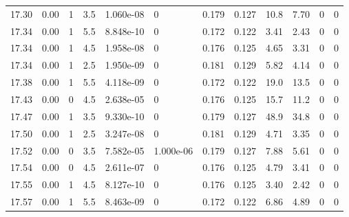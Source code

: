 \documentclass[preview]{standalone}
\begin{document}
{{{{{{{{{{{{{{{{\begin{tabular}{L{1.2cm}C{1.2cm} C{0.3cm}C{0.5cm} C{1.4cm}C{1.4cm} C{1.4cm}C{1.4cm} C{1.6cm}C{1.6cm} C{1.6cm}C{1.6cm}}
  17.30  &  0.00  & 1     & 3.5 &  1.060e-08  & 0  &  0.179&   0.127& 10.8 & 7.70   &  0 & 0  \\ 
  17.34  &  0.00  & 1     & 5.5 &  8.848e-10  & 0  &  0.172&   0.122& 3.41 & 2.43   &  0 & 0  \\ 
  17.34  &  0.00  & 1     & 4.5 &  1.958e-08  & 0  &  0.176&   0.125& 4.65 & 3.31   &  0 & 0  \\ 
  17.34  &  0.00  & 1     & 2.5 &  1.950e-09  & 0  &  0.181&   0.129& 5.82 & 4.14   &  0 & 0  \\ 
  17.38  &  0.00  & 1     & 5.5 &  4.118e-09  & 0  &  0.172&   0.122& 19.0 & 13.5   &  0 & 0  \\ 
  17.43  &  0.00  & 0     & 4.5 &  2.638e-05  & 0  &  0.176&   0.125& 15.7 & 11.2   &  0 & 0  \\ 
  17.47  &  0.00  & 1     & 3.5 &  9.330e-10  & 0  &  0.179&   0.127& 48.9 & 34.8   &  0 & 0  \\ 
  17.50  &  0.00  & 1     & 2.5 &  3.247e-08  & 0  &  0.181&   0.129& 4.71 & 3.35   &  0 & 0  \\ 
  17.52  &  0.00  & 0     & 3.5 &  7.582e-05  & 1.000e-06  &  0.179&   0.127& 7.88 & 5.61   &  0 & 0  \\ 
  17.54  &  0.00  & 0     & 4.5 &  2.611e-07  & 0  &  0.176&   0.125& 4.79 & 3.41   &  0 & 0  \\ 
  17.55  &  0.00  & 1     & 4.5 &  8.127e-10  & 0  &  0.176&   0.125& 3.40 & 2.42   &  0 & 0  \\ 
  17.57  &  0.00  & 1     & 5.5 &  8.463e-09  & 0  &  0.172&   0.122& 6.86 & 4.89   &  0 & 0  \\ 
\hline 
\end{tabular} 

}}}}}}}}}}}}}}}}
\end{document}
